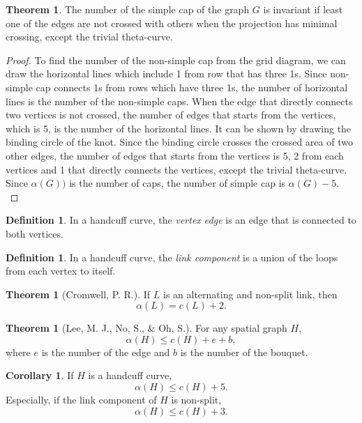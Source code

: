 \documentclass{article}
\theoremstyle{definition}
\newtheorem{defn}[thm]{Definition}
\theoremstyle{theorem}
\newtheorem{theorem}[thm]{Theorem}
\theoremstyle{proposition}
\theoremstyle{corollary}
\newtheorem{corol}[thm]{Corollary}
\begin{document}
\begin{theorem}
The number of the simple cap of the graph $G$ is invariant if least one of the edges are not crossed with others when the projection has minimal crossing, except the trivial theta-curve.
\end{theorem}
\begin{proof}
     To find the number of the non-simple cap from the grid diagram, we can draw the horizontal lines which include 1 from row that has three 1s. Since non-simple cap connects 1s from rows which have three 1s, the number of horizontal lines is the number of the non-simple caps. When the edge that directly connects two vertices is not crossed, the number of edges that starts from the vertices, which is 5, is the number of the horizontal lines. It can be shown by drawing the binding circle of the knot. Since the binding circle crosses the crossed area of two other edges, the number of edges that starts from the vertices is 5, 2 from each vertices and 1 that directly connects the vertices, except the trivial theta-curve. Since $\alpha(G))$ is the number of caps, the number of simple cap is $\alpha(G) - 5$.\\
\end{proof}

\begin{defn}
    In a handcuff curve, the \textit{vertex edge} is an edge that is connected to both vertices.
\end{defn}

\begin{defn}
    In a handcuff curve, the \textit{link component} is a union of the loops from each vertex to itself.
\end{defn}

\begin{theorem}[Cromwell, P. R.]
    If $L$ is an alternating and non-split link, then
    \[ \alpha(L) = c(L)+2. \]
\end{theorem}

\begin{theorem}[Lee, M. J., No, S., \& Oh, S.]
    For any spatial graph $H$,
    \[ \alpha(H) \leq c(H)+e+b, \]
    where $e$ is the number of the edge and $b$ is the number of the bouquet.
\end{theorem}

\begin{corol}
    If $H$ is a handcuff curve,
    \[ \alpha(H) \leq c(H)+5. \]
    Especially, if the link component of $H$ is non-split,
    \[ \alpha(H) \leq c(H)+3. \]
\end{corol}
\end{document}
